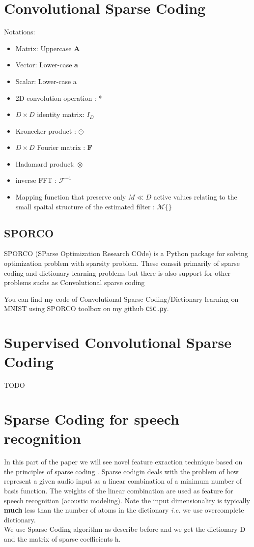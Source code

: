 \documentclass[a4paper,10pt]{article}
\begin{document}
\section{Convolutional Sparse Coding}
Notations:
\begin{itemize}
 \item Matrix: Uppercase  \textbf{A}
 \item Vector: Lower-case  \textbf{a}
 \item Scalar: Lower-case a
 \item 2D convolution operation : *
 \item $D \times D$ identity matrix: \textbf{$I_D$}
 \item Kronecker product : $\odot$
 \item $D \times D$ Fourier matrix : \textbf{F}
 \item Hadamard product: $\otimes$
 \item inverse FFT : $ \mathcal{F}^{-1}$
 \item Mapping function that preserve only $M \ll D$ active values relating to the small spaital structure of the estimated filter : $ \mathcal{M}\{\}$
\end{itemize} 



\subsection{SPORCO}
SPORCO (SParse Optimization Research COde) is a Python package for solving optimization problem with sparsity problem. These conssit primarily of sparse coding and dictionary learning problems but there is also support for other problems suchs as Convolutional sparse coding \cite{wohlberg-2017-sporco, wohlberg-2016-sporco}

You can find my code of Convolutional Sparse Coding/Dictionary learning on MNIST using SPORCO toolbox on my github \texttt{CSC.py}.\\

\newpage

\newpage

\newpage
\section{Supervised Convolutional Sparse Coding}
TODO
\newpage
\section{Sparse Coding for speech recognition}
In this part of the paper we will see novel feature exraction technique based on the principles of sparse coding \cite{DL_speech_reco}. Sparse codigin deals with the problem of how represent a given audio input as a linear combination of a minimum number of basis function. The weights of the linear combination are used as feature for speech recognition (acoustic modeling). Note the input dimensionality is typically \textbf{much} less than the number of atoms in the dictionary \textit{i.e.} we use overcomplete dictionary.\\
We use Sparse Coding algorithm as describe before and we get the dictionary D and  the matrix of sparse coefficients  h.\\
\end{document}
